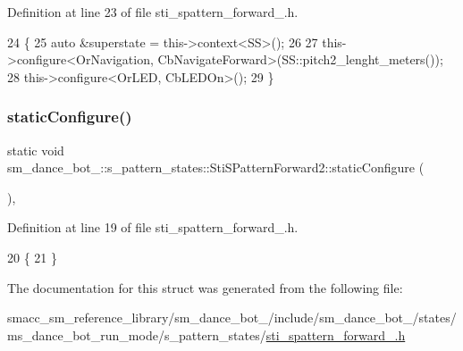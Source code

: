 Definition at line 23 of file sti\+\_\+spattern\+\_\+forward\+\_.\+h.


\begin{DoxyCode}
24   \{
25     \textcolor{keyword}{auto} &superstate = this->context<SS>();
26 
27     this->configure<OrNavigation, CbNavigateForward>(SS::pitch2\_lenght\_meters());
28     this->configure<OrLED, CbLEDOn>();
29   \}
\end{DoxyCode}
\mbox{\label{structsm__dance__bot__2_1_1s__pattern__states_1_1StiSPatternForward2_ad3ccc09090ed9cfe1e129a9c4531fedf}} 
\subsubsection{\texorpdfstring{static\+Configure()}{staticConfigure()}}
{\footnotesize\ttfamily static void sm\+\_\+dance\+\_\+bot\+\_\+::s\+\_\+pattern\+\_\+states\+::\+Sti\+S\+Pattern\+Forward2\+::static\+Configure (\begin{DoxyParamCaption}{ }\end{DoxyParamCaption})\hspace{0.3cm}{\ttfamily [inline]}, {\ttfamily [static]}}



Definition at line 19 of file sti\+\_\+spattern\+\_\+forward\+\_.\+h.


\begin{DoxyCode}
20   \{
21   \}
\end{DoxyCode}


The documentation for this struct was generated from the following file\+:\begin{DoxyCompactItemize}
\item 
smacc\+\_\+sm\+\_\+reference\+\_\+library/sm\+\_\+dance\+\_\+bot\+\_/include/sm\+\_\+dance\+\_\+bot\+\_/states/ms\+\_\+dance\+\_\+bot\+\_\+run\+\_\+mode/s\+\_\+pattern\+\_\+states/\hyperlink{sm__dance__bot__2_2include_2sm__dance__bot__2_2states_2ms__dance__bot__run__mode_2s__pattern__st7e44c69c237efffd744946bdab03c742}{sti\+\_\+spattern\+\_\+forward\+\_.\+h}\end{DoxyCompactItemize}
